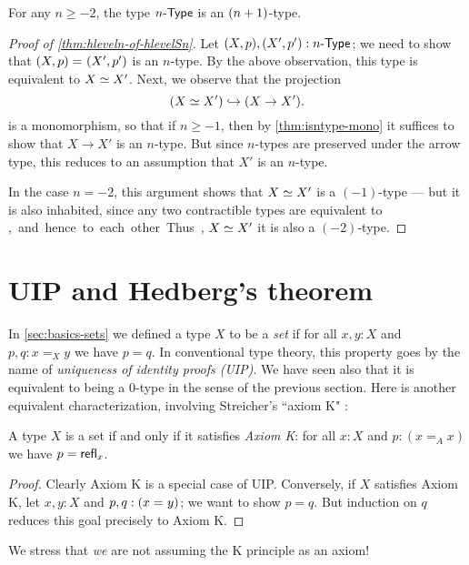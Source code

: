 \begin{thm}\label{thm:hleveln-of-hlevelSn}
 For any $n \geq -2$, the type ${n}\text-\mathsf{Type}$ is an $(n+1)$-type.
\end{thm}
\begin{proof}[Proof of \autoref{thm:hleveln-of-hlevelSn}]
  Let $(X, p), (X', p') : {n}\text-\mathsf{Type}$; we need to show that $(X, p) =_{} (X', p')$ is an $n$-type.
  By the above observation, this type is equivalent to $X \simeq X'$.
  Next, we observe that the projection
  \[(X \simeq X') \hookrightarrow (X \rightarrow X').\]
  is a monomorphism, so that if $n\geq -1$, then by \autoref{thm:isntype-mono} it suffices to show that $X \rightarrow X'$ is an $n$-type.
  But since $n$-types are preserved under the arrow type, this reduces to an assumption that $X'$ is an $n$-type.

  In the case $n=-2$, this argument shows that $X \simeq X'$ is a $(-1)$-type --- but it is also inhabited, since any two contractible types
are equivalent to \unit, and hence to each other.
  Thus, $X \simeq X'$ it is also a $(-2)$-type.
\end{proof}

\section{UIP and Hedberg's theorem}
\label{sec:hedberg}

In \autoref{sec:basics-sets} we defined a type $X$ to be a \emph{set} if for all $x, y : X$ and $p, q : x =_X y$ we have $p = q$.
In conventional type theory, this property goes by the name of \emph{uniqueness of identity proofs (UIP)}.
We have seen also that it is equivalent to being a $0$-type in the sense of the previous section.
Here is another equivalent characterization, involving Streicher's ``axiom K" \cite{StreicherK}:

\begin{thm}\label{thm:h-set-uip-K}
 A type $X$ is a set if and only if it satisfies \emph{Axiom K}: for all $x : X$ and $p : (x =_A x)$ we have $p = \mathsf{refl}_{x}$.
\end{thm}

\begin{proof}
  Clearly Axiom K is a special case of UIP.
  Conversely, if $X$ satisfies Axiom K, let $x, y : X$ and $p, q : (x =_{} y)$; we want to show $p=q$.
  But induction on $q$ reduces this goal precisely to Axiom K.
\end{proof}

We stress that \emph{we} are not assuming the K principle as an axiom!

